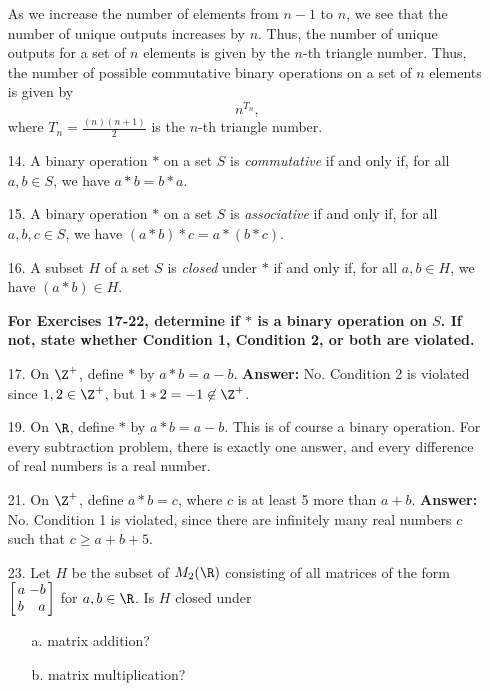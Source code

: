 \documentclass[letterpaper]{article}
\begin{document}
\begin{enumerate}
As we increase the number of elements from $n-1$ to $n$, we see that the number of unique outputs increases by $n$. Thus, the number of unique outputs for a set of $n$ elements is given by the $n$-th triangle number. Thus, the number of possible commutative binary operations on a set of $n$ elements is given by 
$$ n^{T_n}, $$
where $T_n=\frac{(n)(n+1)}{2}$ is the $n$-th triangle number.
\item[14.] A binary operation $*$ on a set $S$ is \emph{commutative} if and only if, for all $a,b\in S$, we have $a*b=b*a$. 
\item[15.] A binary operation $*$ on a set $S$ is \emph{associative} if and only if, for all $a,b,c\in S$, we have $(a*b)*c=a*(b*c)$. 
\item[16.] A subset $H$ of a set $S$ is \emph{closed} under $*$ if and only if, for all $a,b\in H$, we have $(a*b)\in H$. 

\textbf{For Exercises 17-22, determine if $*$ is a binary operation on $S$. If not, state whether Condition 1, Condition 2, or both are violated. }
\item[17.] On $\Z^+$, define $*$ by $a*b=a-b$. 
\textbf{Answer: } No. Condition 2 is violated since $1,2\in \Z^+$, but $1*2=-1\not\in\Z^+$. 
\item[19.] On $\R$, define $*$ by $a*b=a-b$. This is of course a binary operation. For every subtraction problem, there is exactly one answer, and every difference of real numbers is a real number. 
\item[21.] On $\Z^+$, define $a*b=c$, where $c$ is at least 5 more than $a+b$. \textbf{Answer: } No. Condition 1 is violated, since there are infinitely many real numbers $c$ such that $c\geq a+b+5$. 
\item[23.] Let $H$ be the subset of $M_2(\R)$ consisting of all matrices of the form 
$\arraycolsep=1.4pt\def\arraystretch{1}
\left[\begin{array}{lr}
a & -b \\
b & a \\
\end{array} \right]$ 
for $a,b\in \R$. Is $H$ closed under
\begin{enumerate}
	\item[a.] matrix addition?
	\item[b.] matrix multiplication?
\end{enumerate}


\end{enumerate}
\end{document}
